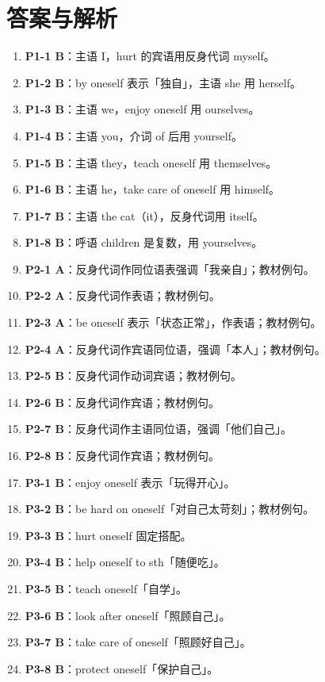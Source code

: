 \documentclass[11pt,a4paper]{ctexart}
\begin{document}
\section*{答案与解析}
\small
\begin{enumerate}[leftmargin=1.6em,itemsep=2pt]
\item \textbf{P1-1 B}：主语 I，hurt 的宾语用反身代词 myself。
\item \textbf{P1-2 B}：by oneself 表示「独自」，主语 she 用 herself。
\item \textbf{P1-3 B}：主语 we，enjoy oneself 用 ourselves。
\item \textbf{P1-4 B}：主语 you，介词 of 后用 yourself。
\item \textbf{P1-5 B}：主语 they，teach oneself 用 themselves。
\item \textbf{P1-6 B}：主语 he，take care of oneself 用 himself。
\item \textbf{P1-7 B}：主语 the cat（it），反身代词用 itself。
\item \textbf{P1-8 B}：呼语 children 是复数，用 yourselves。
\item \textbf{P2-1 A}：反身代词作同位语表强调「我亲自」；教材例句。
\item \textbf{P2-2 A}：反身代词作表语；教材例句。
\item \textbf{P2-3 A}：be oneself 表示「状态正常」，作表语；教材例句。
\item \textbf{P2-4 A}：反身代词作宾语同位语，强调「本人」；教材例句。
\item \textbf{P2-5 B}：反身代词作动词宾语；教材例句。
\item \textbf{P2-6 B}：反身代词作宾语；教材例句。
\item \textbf{P2-7 B}：反身代词作主语同位语，强调「他们自己」。
\item \textbf{P2-8 B}：反身代词作宾语；教材例句。
\item \textbf{P3-1 B}：enjoy oneself 表示「玩得开心」。
\item \textbf{P3-2 B}：be hard on oneself「对自己太苛刻」；教材例句。
\item \textbf{P3-3 B}：hurt oneself 固定搭配。
\item \textbf{P3-4 B}：help oneself to sth「随便吃」。
\item \textbf{P3-5 B}：teach oneself「自学」。
\item \textbf{P3-6 B}：look after oneself「照顾自己」。
\item \textbf{P3-7 B}：take care of oneself「照顾好自己」。
\item \textbf{P3-8 B}：protect oneself「保护自己」。

\end{enumerate}
\end{document}
